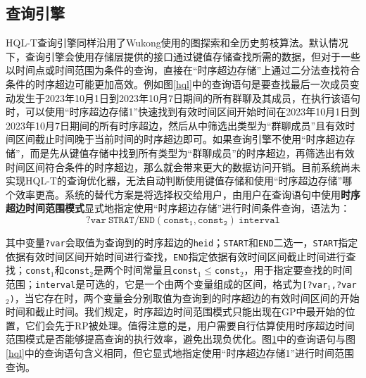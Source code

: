 \subsection{查询引擎}
HQL-T查询引擎同样沿用了Wukong使用的图探索和全历史剪枝算法。默认情况下，查询引擎会使用存储层提供的接口通过键值存储查找所需的数据，但对于一些以时间点或时间范围为条件的查询，直接在“时序超边存储”上通过二分法查找符合条件的时序超边可能更加高效。例如图\ref{hql}中的查询语句是要查找最后一次成员变动发生于2023年10月1日到2023年10月7日期间的所有群聊及其成员，在执行该语句时，可以使用“时序超边存储1”快速找到有效时间区间开始时间在2023年10月1日到2023年10月7日期间的所有时序超边，然后从中筛选出类型为“群聊成员”且有效时间区间截止时间晚于当前时间的时序超边即可。如果查询引擎不使用“时序超边存储”，而是先从键值存储中找到所有类型为“群聊成员”的时序超边，再筛选出有效时间区间符合条件的时序超边，那么就会带来更大的数据访问开销。目前系统尚未实现HQL-T的查询优化器，无法自动判断使用键值存储和使用“时序超边存储”哪个效率更高。系统的替代方案是将选择权交给用户，由用户在查询语句中使用\textbf{时序超边时间范围模式}显式地指定使用“时序超边存储”进行时间条件查询，语法为：
\begin{equation}
    \mathtt{?var \ STRAT/END(const_1, const_2) \ interval}
\end{equation}

其中变量\texttt{?var}会取值为查询到的时序超边的\texttt{heid}；\texttt{START}和\texttt{END}二选一，\texttt{START}指定依据有效时间区间开始时间进行查找，\texttt{END}指定依据有效时间区间截止时间进行查找；\texttt{const$_1$}和\texttt{const$_2$}是两个时间常量且\texttt{const$_1\leq$const$_2$}，用于指定要查找的时间范围；\texttt{interval}是可选的，它是一个由两个变量组成的区间，格式为\texttt{[?var$_1$,?var$_2$)}，当它存在时，两个变量会分别取值为查询到的时序超边的有效时间区间的开始时间和截止时间。我们规定，时序超边时间范围模式只能出现在GP中最开始的位置，它们会先于RP被处理。值得注意的是，用户需要自行估算使用时序超边时间范围模式是否能够提高查询的执行效率，避免出现负优化。图\ref{guide}中的查询语句与图\ref{hql}中的查询语句含义相同，但它显式地指定使用“时序超边存储1”进行时间范围查询。

\begin{figure}[!htb]
\label{guide}
\end{figure}

